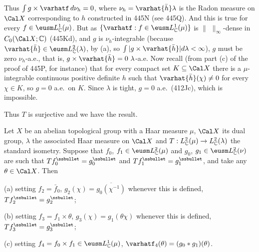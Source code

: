 {\noindent Thus $\int g\times\varhatf\,d\nu_h=0$, where
$\nu_h=\varhat{\bar h}\lambda$ is the
Radon measure on $\Cal X$ corresponding to $h$ constructed in 445N (see
445Q).   And this is true for every $f\in\eusm L_{\Bbb C}^1(\mu)$.   But
as $\{\varhatf:f\in\eusm L_{\Bbb C}^1(\mu)\}$ is
$\|\,\,\|_{\infty}$-dense in
$C_0(\Cal X;\Bbb C)$ (445Kd), and $g$ is $\nu_h$-integrable (because
$\varhat{\bar h}\in\eusm L_{\Bbb C}^2(\lambda)$, by (a), so
$\int|g\times\varhat{\bar h}|d\lambda<\infty$), $g$ must be zero
$\nu_h$-a.e., that is,
$g\times\varhat{\bar h}=0\,\,\lambda$-a.e.   Now recall (from part (c)
of the proof of 445P, for instance) that for every compact set
$K\subseteq\Cal X$ there is a $\mu$-integrable continuous positive
definite $h$ such that $\varhat{\bar h}(\chi)\ne 0$ for every
$\chi\in K$, so $g=0$ a.e.\ on $K$.   Since $\lambda$ is tight,
$g=0$ a.e.\ (412Jc), which is impossible.\ \Bang\Qed

Thus $T$ is surjective and we have the result.
}%

   Let $X$ be an abelian topological group
with a Haar measure $\mu$, $\Cal X$ its dual group, $\lambda$ the
associated Haar measure on $\Cal X$ and
$T:L_{\Bbb C}^2(\mu)\to L_{\Bbb C}^2(\lambda)$ the
standard isometry.   Suppose that $f_0$,
$f_1\in\eusm L_{\Bbb C}^2(\mu)$ and $g_0$,
$g_1\in\eusm L_{\Bbb C}^2(\nu)$
are such that $Tf_0^{\ssbullet}=g_0^{\ssbullet}$ and
$Tf_1^{\ssbullet}=g_1^{\ssbullet}$, and take any $\theta\in\Cal X$.
Then

(a) setting $f_2=\bar f_0$, $g_2(\chi)=\overline{g_0(\chi^{-1})}$
whenever this is defined, $Tf_2^{\ssbullet}=g_2^{\ssbullet}$;

(b) setting $f_3=f_1\times\theta$, $g_3(\chi)=g_1(\theta\chi)$ whenever
this is defined, $Tf_3^{\ssbullet}=g_3^{\ssbullet}$;

(c) setting $f_4=f_0\times f_1\in\eusm L_{\Bbb C}^1(\mu)$,
$\varhatf_4(\theta)=(g_0*g_1)(\theta)$.

